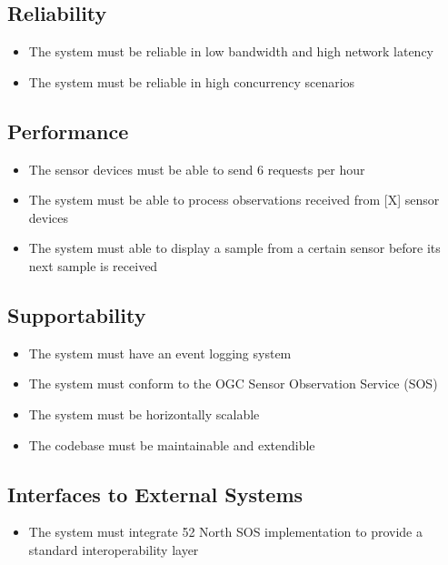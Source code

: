 \subsection*{Reliability}

\begin{itemize}
	\item The system must be reliable in low bandwidth and high network latency
	\item The system must be reliable in high concurrency scenarios
\end{itemize}

\subsection*{Performance}

\begin{itemize}
	\item The sensor devices must be able to send 6 requests per hour
	\item The system must be able to process observations received from [X] sensor devices
	\item The system must able to display a sample from a certain sensor before its next sample is received
\end{itemize}

\subsection*{Supportability}

\begin{itemize}
	\item The system must have an event logging system
	\item The system must conform to the OGC Sensor Observation Service (SOS)
	\item The system must be horizontally scalable
	\item The codebase must be maintainable and extendible
\end{itemize}

\subsection*{Interfaces to External Systems}

\begin{itemize}
	\item The system must integrate 52 North SOS implementation to provide a standard interoperability layer
\end{itemize}

